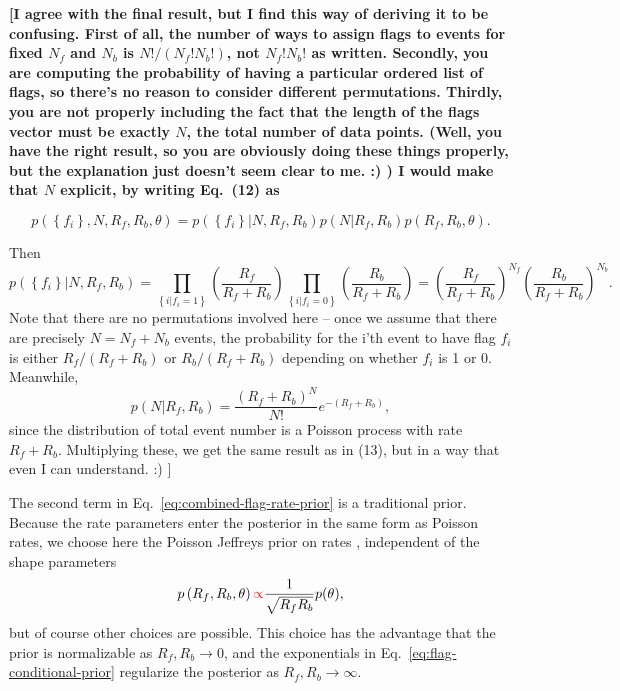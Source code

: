 \documentclass[aps,prd]{revtex4-1}
\newcommand{\mathset}[1]{\left\{ #1 \right\}}
\newcommand{\ilya}[1]{{\color{red} \bf #1}}
\begin{document}
\ilya{[I agree with the final result, but I find this way of deriving
    it to be confusing.  First of all, the number of ways to assign
    flags to events for fixed $N_f$ and $N_b$ is $N!/(N_f! N_b!)$, not
    $N_f! N_b!$ as written.  Secondly, you are computing the
    probability of having a particular ordered list of flags, so
    there's no reason to consider different permutations.  Thirdly,
    you are not properly including the fact that the length of the
    flags vector must be exactly $N$, the total number of data points.
    (Well, you have the right result, so you are obviously doing these
    things properly, but the explanation just doesn't seem clear to
    me. :) ) I would make that $N$ explicit, by writing Eq.~(12) as

$$
  p\left(\mathset{f_i}, N, R_f, R_b, \theta\right)  = 
  p\left( \mathset{f_i} | N, R_f, R_b\right) p\left(N |R_f, R_b\right)  
 p\left(R_f, R_b, \theta\right).
$$

Then 
$$ p\left( \mathset{f_i} | N, R_f, R_b\right) = 
\prod_{\mathset{i|f_i=1}} \left(\frac{R_f}{R_f+R_b}\right) 
\prod_{\mathset{i|f_i=0}} \left(\frac{R_b}{R_f+R_b}\right) =
\left(\frac{R_f}{R_f+R_b}\right)^{N_f} \left(\frac{R_b}{R_f+R_b}\right)^{N_b}. 
$$ Note that there are no permutations involved here -- once we assume
that there are precisely $N=N_f+N_b$ events, the probability for the
i'th event to have flag $f_i$ is either $R_f/(R_f+R_b)$ or
$R_b/(R_f+R_b)$ depending on whether $f_i$ is 1 or 0.  Meanwhile,
$$
p\left(N |R_f, R_b\right) = \frac{\left(R_f+R_b\right)^N}{N!} e^{-(R_f+R_b)},
$$ since the distribution of total event number is a Poisson process
with rate $R_f+R_b$.  Multiplying these, we get the same result as in
(13), but in a way that even I can understand. :) ]}

The second term in Eq.~\eqref{eq:combined-flag-rate-prior} is a
traditional prior.  Because the rate parameters enter the posterior in
the same form as Poisson rates, we choose here the Poisson Jeffreys
prior on rates \citep{Jeffreys1946}, independent of the shape
parameters
\begin{equation}
  p\left( R_f, R_b, \theta\right) \ilya{\propto} \frac{1}{\sqrt{R_f R_b}} p(\theta),
\end{equation}
but of course other choices are possible.  This choice has the
advantage that the prior is normalizable as $R_f, R_b \to 0$, and the
exponentials in Eq.~\eqref{eq:flag-conditional-prior} regularize the
posterior as $R_f, R_b \to \infty$.
\end{document}
